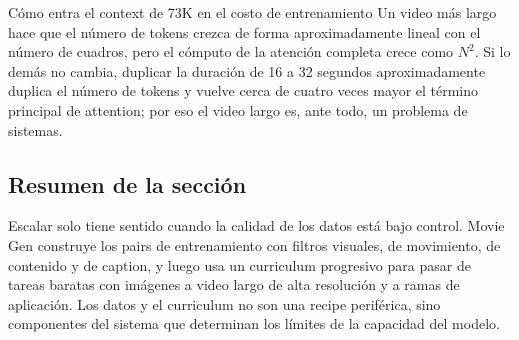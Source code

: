 \begin{knowledgebox}{Cómo entra el context de 73K en el costo de entrenamiento}
Un video más largo hace que el número de tokens crezca de forma aproximadamente lineal con el número de cuadros, pero el cómputo de la atención completa crece como $N^2$. Si lo demás no cambia, duplicar la duración de 16 a 32 segundos aproximadamente duplica el número de tokens y vuelve cerca de cuatro veces mayor el término principal de attention; por eso el video largo es, ante todo, un problema de sistemas.
\end{knowledgebox}


\subsection{Resumen de la sección}

Escalar solo tiene sentido cuando la calidad de los datos está bajo control. Movie Gen construye los pairs de entrenamiento con filtros visuales, de movimiento, de contenido y de caption, y luego usa un curriculum progresivo para pasar de tareas baratas con imágenes a video largo de alta resolución y a ramas de aplicación. Los datos y el curriculum no son una recipe periférica, sino componentes del sistema que determinan los límites de la capacidad del modelo.
